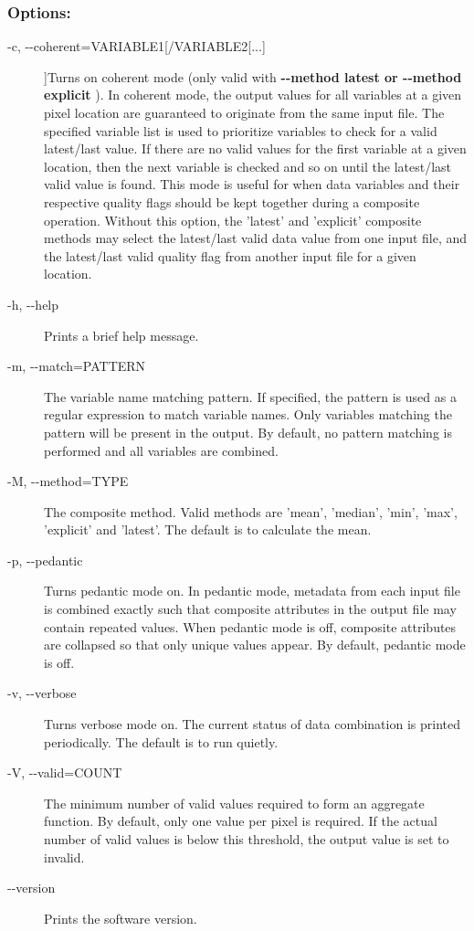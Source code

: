 \subsubsection*{Options:}
\begin{description}
\item[-c, -{-}coherent=VARIABLE1[/VARIABLE2[...{]}]]Turns on coherent mode (only valid with \textbf{-{-}method latest or -{-}method explicit}
). In coherent mode, the output values for all variables at a given pixel location are guaranteed to originate from the same input file. The specified variable list is used to prioritize variables to check for a valid latest/last value. If there are no valid values for the first variable at a given location, then the next variable is checked and so on until the latest/last valid value is found. This mode is useful for when data variables and their respective quality flags should be kept together during a composite operation. Without this option, the 'latest' and 'explicit' composite methods may select the latest/last valid data value from one input file, and the latest/last valid quality flag from another input file for a given location.
\item[-h, -{-}help]Prints a brief help message.
\item[-m, -{-}match=PATTERN]The variable name matching pattern. If specified, the pattern is used as a regular expression to match variable names. Only variables matching the pattern will be present in the output. By default, no pattern matching is performed and all variables are combined.
\item[-M, -{-}method=TYPE]The composite method. Valid methods are 'mean', 'median', 'min', 'max', 'explicit' and 'latest'. The default is to calculate the mean.
\item[-p, -{-}pedantic]Turns pedantic mode on. In pedantic mode, metadata from each input file is combined exactly such that composite attributes in the output file may contain repeated values. When pedantic mode is off, composite attributes are collapsed so that only unique values appear. By default, pedantic mode is off.
\item[-v, -{-}verbose]Turns verbose mode on. The current status of data combination is printed periodically. The default is to run quietly.
\item[-V, -{-}valid=COUNT]The minimum number of valid values required to form an aggregate function. By default, only one value per pixel is required. If the actual number of valid values is below this threshold, the output value is set to invalid.
\item[-{-}version]Prints the software version.

\end{description}
